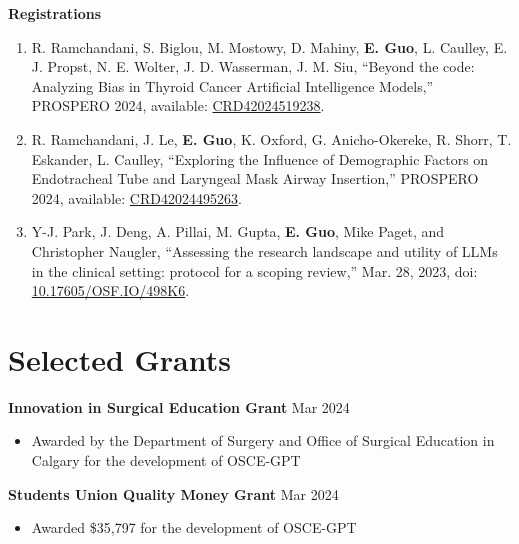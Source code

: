 \documentclass{article}
\begin{document}
\textbf{Registrations} \vspace{.5em}

\begin{enumerate}
    \item R. Ramchandani, S. Biglou, M. Mostowy, D. Mahiny, \textbf{E. Guo}, L. Caulley, E. J. Propst, N. E. Wolter, J. D. Wasserman, J. M. Siu, ``Beyond the code: Analyzing Bias in Thyroid Cancer Artificial Intelligence Models,'' PROSPERO 2024, available: \href{https://www.crd.york.ac.uk/prospero/display_record.php?ID=CRD42024519238}{CRD42024519238}.
    \item R. Ramchandani, J. Le, \textbf{E. Guo}, K. Oxford, G. Anicho-Okereke, R. Shorr, T. Eskander, L. Caulley, ``Exploring the Influence of Demographic Factors on Endotracheal Tube and Laryngeal Mask Airway Insertion,'' PROSPERO 2024, available: \href{https://www.crd.york.ac.uk/prospero/display_record.php?ID=CRD42024495263}{CRD42024495263}.
    \item Y-J. Park, J. Deng, A. Pillai, M. Gupta, \textbf{E. Guo}, Mike Paget, and Christopher Naugler, ``Assessing the research landscape and utility of LLMs in the clinical setting: protocol for a scoping review,'' Mar. 28, 2023, doi: \href{https://osf.io/498k6}{10.17605/OSF.IO/498K6}.
\end{enumerate}


\section*{\textcolor{my_colour}{Selected Grants} }
\vspace{-.25em} \hrulefill \vspace{.25em}

\textbf{Innovation in Surgical Education Grant} \hfill Mar 2024
\begin{itemize}
    \item Awarded by the Department of Surgery and Office of Surgical Education in Calgary for the development of OSCE-GPT
\end{itemize} \vspace{1em}

\textbf{Students Union Quality Money Grant} \hfill Mar 2024
\begin{itemize}
    \item Awarded \$35,797 for the development of OSCE-GPT
\end{itemize} \vspace{1em}
\end{document}

